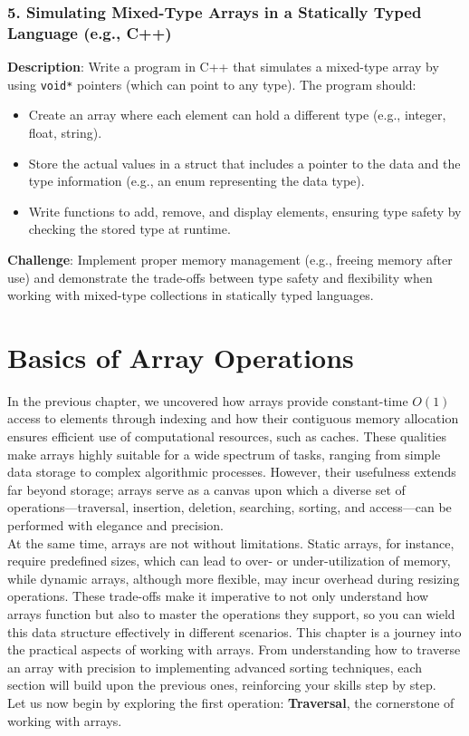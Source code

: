 \documentclass[12pt, oneside]{book}
\begin{document}
\subsection*{5. Simulating Mixed-Type Arrays in a Statically Typed Language (e.g., C++)}
\textbf{Description}: Write a program in C++ that simulates a mixed-type array by using \texttt{void*} pointers (which can point to any type). The program should:
\begin{itemize}
	\item Create an array where each element can hold a different type (e.g., integer, float, string).
	\item Store the actual values in a struct that includes a pointer to the data and the type information (e.g., an enum representing the data type).
	\item Write functions to add, remove, and display elements, ensuring type safety by checking the stored type at runtime.
\end{itemize}

\textbf{Challenge}: Implement proper memory management (e.g., freeing memory after use) and demonstrate the trade-offs between type safety and flexibility when working with mixed-type collections in statically typed languages.

\chapter{Basics of Array Operations}
In the previous chapter, we uncovered how arrays provide constant-time \(O(1)\) access to elements through indexing and how their contiguous memory allocation ensures efficient use of computational resources, such as caches. These qualities make arrays highly suitable for a wide spectrum of tasks, ranging from simple data storage to complex algorithmic processes. However, their usefulness extends far beyond storage; arrays serve as a canvas upon which a diverse set of operations—traversal, insertion, deletion, searching, sorting, and access—can be performed with elegance and precision.\\
At the same time, arrays are not without limitations. Static arrays, for instance, require predefined sizes, which can lead to over- or under-utilization of memory, while dynamic arrays, although more flexible, may incur overhead during resizing operations. These trade-offs make it imperative to not only understand how arrays function but also to master the operations they support, so you can wield this data structure effectively in different scenarios. This chapter is a journey into the practical aspects of working with arrays. From understanding how to traverse an array with precision to implementing advanced sorting techniques, each section will build upon the previous ones, reinforcing your skills step by step.\\ Let us now begin by exploring the first operation: \textbf{Traversal}, the cornerstone of working with arrays.
\end{document}
